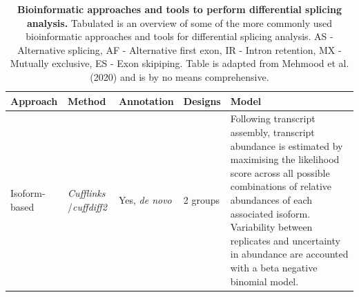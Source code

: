 \begin{landscape}
	\small %
	\setlength\tabcolsep{2pt} %
	\renewcommand{\arraystretch}{1}
\begin{longtable}[c]{p{2.5cm}p{2cm}p{2cm}p{1.5cm}p{17.5cm}}
	\caption[Bioinformatic approaches and tools to perform differential splicing analysis]%
	{\textbf{Bioinformatic approaches and tools to perform differential splicing analysis.} Tabulated is an overview of some of the more commonly used bioinformatic approaches and tools for differential splicing analysis. \newline AS - Alternative splicing, AF - Alternative first exon, IR - Intron retention, MX - Mutually exclusive, ES - Exon skipiping. Table is adapted from Mehmood et al. (2020)\cite{Mehmood2020} and is by no means comprehensive. }
	\label{tab: rnaseq_diffsplicing}\\
	\toprule
	Approach &
	Method &
	Annotation &
	Designs &
	Model \\ \midrule
	\multirow{2}{*}{Isoform-based} &
	\textit{Cufflinks} \newline /\textit{cuffdiff2} &
	Yes, \textit{de novo} &
	2 groups &
	\tabitem Following transcript assembly, transcript abundance is estimated by maximising the likelihood score across all possible combinations of relative abundances of each associated isoform. \newline 
	\tabitem Variability between replicates and uncertainty in abundance are accounted with a beta negative binomial model. \\ 
	

\end{longtable}
\end{landscape}

